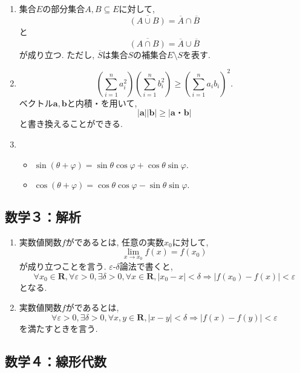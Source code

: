 \documentclass[a4paper,12pt]{jarticle}
\begin{document}
\begin{enumerate}

\item {}
集合$E$の部分集合$A,B \subseteq E$に対して,
\[\overline{(A \cup B)} = \overline{A} \cap \overline{B} \]
と
\[\overline{(A \cap B)} = \overline{A} \cup \overline{B} \]
が成り立つ. ただし, $\overline{S}$は集合$S$の補集合$E \setminus S$を表す.

\item {}
\[ \left( \sum_{i = 1}^{n} a_i^2 \right) \left( \sum_{i = 1}^ {n} b_i^2 \right) \geq \left( \sum_{i = 1}^{n} a_i b_i \right)^2. \]
ベクトル$\bm{a},\bm{b}$と内積・を用いて,
\[| \bm{a} | | \bm{b} | \geq | \bm{a}・\bm{b} | \]
と書き換えることができる.

\item {}

\begin{itemize}
\item $\sin(\theta + \varphi) = \sin \theta \cos \varphi + \cos \theta \sin \varphi.$  
\item $\cos(\theta + \varphi) = \cos \theta \cos \varphi - \sin \theta \sin \varphi.$  
\end{itemize}

\end{enumerate}

\subsection{数学３：解析}

\begin{enumerate}

\item 実数値関数$f$がであるとは, 任意の実数$x_0$に対して,
\[\lim_{x \to x_0} f(x) = f(x_0) \]
が成り立つことを言う. $\varepsilon $-$ \delta$論法で書くと,
\[\forall x_0 \in \mathbf{R}, \forall \varepsilon > 0, \exists \delta > 0, \forall x \in \mathbf{R}, |x_0 - x| < \delta \Rightarrow |f(x_0) - f(x)| < \varepsilon \]
となる.

\item 実数値関数$f$がであるとは,
\[\forall \varepsilon > 0, \exists \delta > 0, \forall x, y \in \mathbf{R}, |x - y| < \delta \Rightarrow |f(x) - f(y)| < \varepsilon \]
を満たすときを言う.

\end{enumerate}

\subsection{数学４：線形代数}
\end{document}
